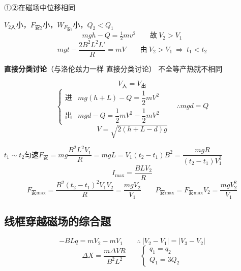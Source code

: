 ①②在磁场中位移相同

$V_{2\text{入}}$小，$F_{\text{安}2}$小，$W_{F_{\text{安}2}}$小，$Q_2<Q_1$
\[ mgh-Q=\tfrac12mv^2\qquad \text{故}\ V_2>V_1 \]
\[ mgt-\frac{2B^2L^2L'}{R}=mV\qquad \text{由}\ V_2>V_1\ \Rightarrow\ t_1<t_2 \]

\textbf{直接分类讨论}（与洛伦兹力一样 直接分类讨论） %
不全等产热就不相同

\[ V_{\text{入}}=V_{\text{出}} \]
\[ \left\{\begin{array}{ll}\text{进} & mg(h+L)-Q=\dfrac{1}{2}mV^2\\[2ex] \text{出} & mgd-Q=\dfrac{1}{2}mV^2-\dfrac{1}{2}mV^2\end{array}\right.\qquad \therefore mgd=Q \]
\[ V=\sqrt{2(h+L-d)g} \]

$t_1\sim t_2$匀速\quad$F_{\text{安}}=mg$\quad$\dfrac{B^2L^2V_1}{R}=mg$\quad$L=V_1(t_2-t_1)$\quad$B^2=\dfrac{mgR}{(t_2-t_1)V_1^3}$ %
\[ I_{\max}=\frac{BLV_2}{R} \]
\[ F_{\text{安}\max}=\frac{B^2(t_2-t_1)^2V_1V_2}{R}=\frac{mgV_2}{V_1}\qquad P_{\text{安}\max}=F_{\text{安}\max}V_2=\frac{mgV_2^2}{V_1} \] %

\subsection{线框穿越磁场的综合题}
\[ -BLq=mV_2-mV_1\qquad \therefore\ |V_2-V_1|=|V_3-V_2| \]
\[ \Delta X=\frac{m\Delta VR}{B^2L^2}\qquad \left\{\begin{array}{l} q_1=q_2\\ Q_1=3Q_2\end{array}\right. \]


